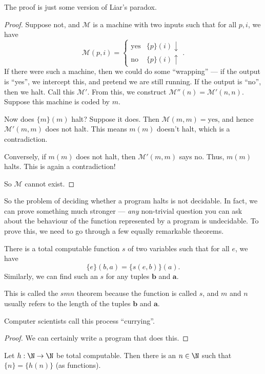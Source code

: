 \documentclass[a4paper]{article}
\begin{document}
The proof is just some version of Liar's paradox.
\begin{proof}
  Suppose not, and $\mathcal{M}$ is a machine with two inputs such that for all $p, i$, we have
  \[
    \mathcal{M}(p, i) =
    \begin{cases}
      \mathrm{yes} & \{p\}(i) \downarrow\\
      \mathrm{no} & \{p\}(i) \uparrow
    \end{cases}.
  \]
  If there were such a machine, then we could do some ``wrapping'' --- if the output is ``yes'', we intercept this, and pretend we are still running. If the output is ``no'', then we halt. Call this $\mathcal{M}'$. From this, we construct $\mathcal{M}''(n) = \mathcal{M}'(n, n)$. Suppose this machine is coded by $m$.

  Now does $\{m\}(m)$ halt? Suppose it does. Then $\mathcal{M}(m, m) = \mathrm{yes}$, and hence $\mathcal{M}'(m, m)$ does not halt. This means $m(m)$ doesn't halt, which is a contradiction.

  Conversely, if $m(m)$ does not halt, then $\mathcal{M}'(m, m)$ says $\mathrm{no}$. Thus, $m(m)$ halts. This is again a contradiction!

  So $\mathcal{M}$ cannot exist.
\end{proof}
So the problem of deciding whether a program halts is not decidable. In fact, we can prove something much stronger --- \emph{any} non-trivial question you can ask about the behaviour of the function represented by a program is undecidable. To prove this, we need to go through a few equally remarkable theorems.

\begin{thm}
  There is a total computable function $s$ of two variables such that for all $e$, we have
  \[
    \{e\}(b, a) = \{s(e, b)\}(a).
  \]
  Similarly, we can find such an $s$ for any tuples $\mathbf{b}$ and $\mathbf{a}$.
\end{thm}
This is called the $smn$ theorem because the function is called $s$, and $m$ and $n$ usually refers to the length of the tuples $\mathbf{b}$ and $\mathbf{a}$.

Computer scientists call this process ``currying''.

\begin{proof}
  We can certainly write a program that does this.
\end{proof}

\begin{thm}
  Let $h: \N \to \N$ be total computable. Then there is an $n \in \N$ such that $\{n\} = \{h(n)\}$ (as functions).
\end{thm}
\end{document}
